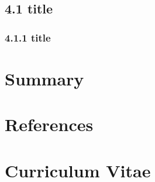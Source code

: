 \documentclass[a4paper,12pt,UTF8,openright]{book}
\begin{document}
\section{4.1 title}
\lipsum[1-5]

\subsection{4.1.1 title}
\lipsum[1-5]

\chapter{Summary}
\lipsum[1-5]

\chapter{References}

\chapter*{Curriculum Vitae}
\lipsum[1-5]
	
\end{document}
